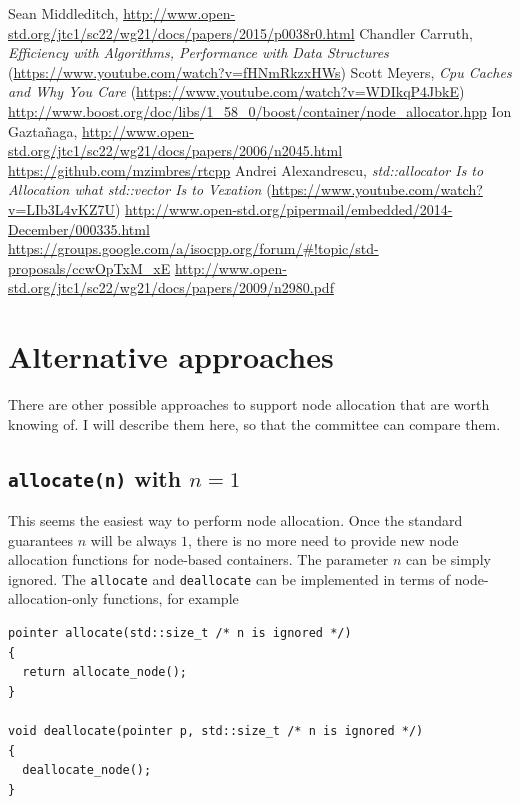\documentclass[11pt]{article}
\begin{document}
\begin{thebibliography}{9}

   Sean Middleditch, \url{http://www.open-std.org/jtc1/sc22/wg21/docs/papers/2015/p0038r0.html}
   Chandler Carruth, {\it Efficiency with Algorithms, Performance
  with Data Structures} (\url{https://www.youtube.com/watch?v=fHNmRkzxHWs})
   Scott Meyers, {\it Cpu Caches and Why You Care} (\url{https://www.youtube.com/watch?v=WDIkqP4JbkE})
   \url{http://www.boost.org/doc/libs/1_58_0/boost/container/node_allocator.hpp}
   Ion Gazta\~ naga, \url{http://www.open-std.org/jtc1/sc22/wg21/docs/papers/2006/n2045.html}
   \url{https://github.com/mzimbres/rtcpp}
   Andrei Alexandrescu, {\it std::allocator Is to Allocation what
  std::vector Is to Vexation} (\url{https://www.youtube.com/watch?v=LIb3L4vKZ7U})
   \url{http://www.open-std.org/pipermail/embedded/2014-December/000335.html}
   \url{https://groups.google.com/a/isocpp.org/forum/#!topic/std-proposals/ccwOpTxM_xE}
   \url{http://www.open-std.org/jtc1/sc22/wg21/docs/papers/2009/n2980.pdf}

\end{thebibliography}

\appendix

\section{Alternative approaches} \label{alternative}

There are other possible approaches to support node allocation that are worth knowing
of.  I will describe them here, so that the committee can compare them.

\subsection{\texttt{allocate(n)} with $n = 1$}

This seems the easiest
way to perform node allocation. Once the standard guarantees $n$ will be always $1$,
there is no more need to provide new node allocation functions for node-based containers. The
parameter $n$ can be simply ignored. The \texttt{allocate} and \texttt{deallocate}
can be implemented in terms of node-allocation-only functions, for example
\medskip
\begin{lstlisting}
pointer allocate(std::size_t /* n is ignored */)
{
  return allocate_node();
}

void deallocate(pointer p, std::size_t /* n is ignored */)
{
  deallocate_node();
}
\end{lstlisting}
\end{document}
